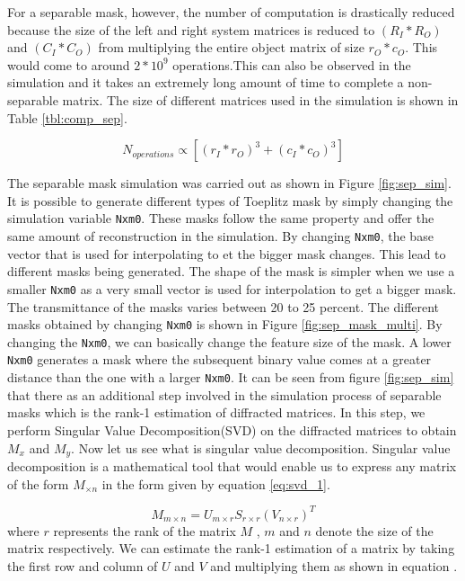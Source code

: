 For a separable mask, however, the number of computation is drastically reduced because the size of the left and right system matrices is reduced to $(R_I*R_O)$ and $(C_I*C_O)$ from multiplying the entire object matrix of size $r_O*c_O$. This would come to around $2*10^9$ operations.This can also be observed in the simulation and it takes an extremely long amount of time to complete a non-separable matrix. The size of different matrices used in the simulation is shown in Table \ref{tbl:comp_sep}.

\begin{equation}
N_{operations} \propto [(r_I*r_O)^3 + (c_I*c_O)^3] 
\label{eq:sep_comp}
\end{equation}

The separable mask simulation was carried out as shown in Figure \ref{fig:sep_sim}. It is possible to generate different types of Toeplitz mask by simply changing the simulation variable \texttt{Nxm0}. These masks follow the same property and offer the same amount of reconstruction in the simulation. By changing \texttt{Nxm0}, the base vector that is used for interpolating to et the bigger mask changes. This lead to different masks being generated. The shape of the mask is simpler when we use a smaller \texttt{Nxm0} as a very small vector is used for interpolation to get a bigger mask. The transmittance of the masks varies between 20 to 25 percent. The different masks obtained by changing \texttt{Nxm0} is shown in Figure \ref{fig:sep_mask_multi}. By changing the \texttt{Nxm0}, we can basically change the feature size of the mask. A lower \texttt{Nxm0} generates a mask where the subsequent binary value comes at a greater distance than the one with a larger \texttt{Nxm0}. It can be seen from figure \ref{fig:sep_sim} that there as an additional step involved in the simulation process of separable masks which is the rank-1 estimation of diffracted matrices. In this step, we perform Singular Value Decomposition(SVD) on the diffracted matrices to obtain $M_x$ and $M_y$. Now let us see what is singular value decomposition. Singular value decomposition is a mathematical tool that would enable us to express any matrix of the form $M_{ \times n}$ in the form given by equation \ref{eq:svd_1}\cite{svd}. 

\begin{equation}
\label{eq:svd_1}
M_{m \times n} = U_{m \times r}S_{r\times r}(V_{n \times r})^T
\end{equation}
where $r$ represents the rank of the matrix $M$ , $m$ and $n$ denote the size of the matrix respectively. We can estimate the rank-1 estimation of a matrix by taking the first row and column of $U$ and $V$ and multiplying them as shown in equation \label{eq:svd_2}.

